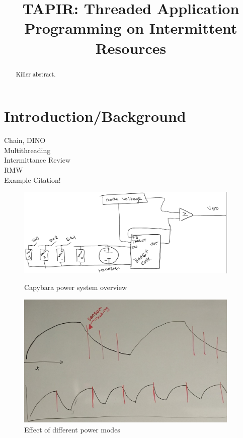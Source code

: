 \documentclass[11pt]{sensys-proc}
\title{TAPIR: Threaded Application Programming on Intermittent Resources}
\begin{document}
\maketitle

\begin{abstract}
Killer abstract.
\end{abstract}

\section{Introduction/Background}
  \label{sec:intro}
  Chain, DINO\\
  Multithreading\\
  Intermittance Review\\
  RMW\\
  Example Citation\cite{RC,Grace}!


\begin{figure}
\centering
\begin{minipage}[b]{0.49\textwidth}
  \includegraphics[width=0.95\textwidth,center]{capybara-all.png}
\caption{Capybara power system overview}\label{label-a}
\end{minipage}\hfill
\begin{minipage}[b]{0.49\textwidth}
  \includegraphics[width=0.95\textwidth,center]{power_modes.pdf}
\caption{Effect of different power modes}\label{label-b}
\end{minipage}
\end{figure}
\end{document}
